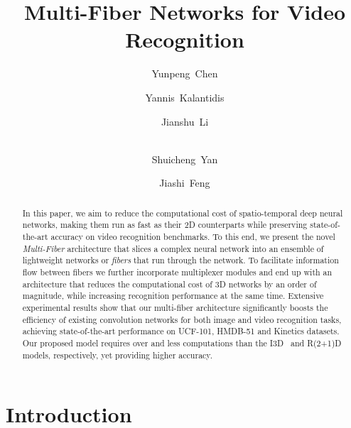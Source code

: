 \documentclass[runningheads]{llncs}
\newcommand{\ourslong}[0]{multi-fiber\xspace}
\newcommand{\ourslongcaps}[0]{Multi-Fiber\xspace}
\newcommand{\switch}[0]{multiplexer\xspace}
\begin{document}
\title{Multi-Fiber Networks for Video Recognition}


\author{Yunpeng~Chen \and
Yannis~Kalantidis \and
Jianshu~Li \and \\
Shuicheng~Yan \and
Jiashi~Feng}


\maketitle              


\begin{abstract}
In this paper, we aim to reduce the computational cost of spatio-temporal deep neural networks, making them run as fast as their 2D counterparts while preserving state-of-the-art accuracy on video recognition benchmarks. To this end, we present the  novel \textit{\ourslongcaps} architecture that slices a complex neural network into an ensemble of lightweight networks or \textit{fibers} that run through the network. To facilitate information flow between fibers we further incorporate \switch modules and end up with an architecture that reduces the computational cost of 3D networks by an order of magnitude, while increasing recognition performance at the same time. Extensive experimental results show that our \ourslong architecture significantly boosts the efficiency of existing convolution networks for both image and video recognition tasks, achieving state-of-the-art performance on UCF-101, HMDB-51 and Kinetics datasets. 
Our proposed model requires over {} and {} less computations than the I3D~\cite{carreira2017quo} and R(2+1)D~\cite{tran2017closer} models, respectively, yet providing higher accuracy.


\end{abstract}
 
\section{Introduction}
\label{sec:intro}
\end{document}
